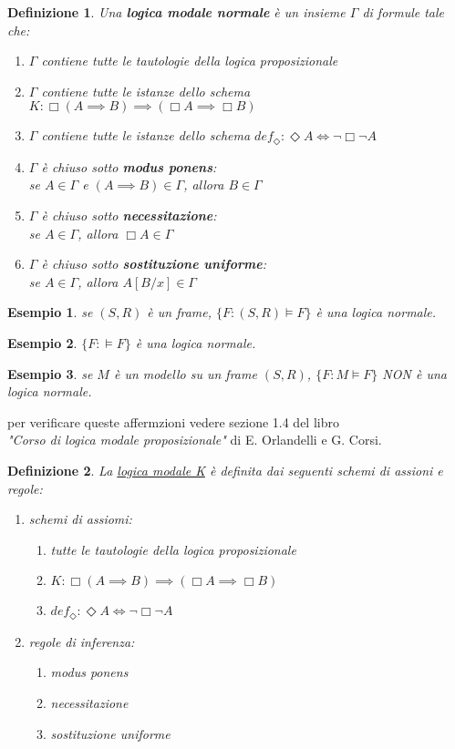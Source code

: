 \documentclass[a4paper,12pt]{article}
\theoremstyle{def}
\newtheorem*{definition}{Definizione}
\theoremstyle{prop}
\theoremstyle{esempio}
\newtheorem*{example}{Esempio}
\theoremstyle{dimostrazione}
\theoremstyle{teo}
\theoremstyle{osservazione}
\begin{document}
\begin{definition}
	Una \textbf{logica modale normale} è un insieme \(\Gamma\) di formule tale che:
	\begin{enumerate}
		\item \(\Gamma\) contiene tutte le tautologie della logica proposizionale
		\item \(\Gamma\) contiene tutte le istanze dello schema \(K: \Box (A \implies B) \implies (\Box A \implies \Box B)\)
		\item \(\Gamma\) contiene tutte le istanze dello schema \(def_\Diamond : \Diamond A \iff \neg \Box \neg A\)
		\item \(\Gamma\) è chiuso sotto \textbf{modus ponens}:\\
		      se \(A \in \Gamma\) e \((A \implies B) \in \Gamma\), allora \(B \in \Gamma\)
		\item \(\Gamma\) è chiuso sotto \textbf{necessitazione}:\\
		      se \(A \in \Gamma\), allora \(\Box A \in \Gamma\)
		\item \(\Gamma\) è chiuso sotto \textbf{sostituzione uniforme}:\\
		      se \(A \in \Gamma\), allora \(A[B/x] \in \Gamma\)
	\end{enumerate}
\end{definition}
\begin{example}
	se \((S,R)\) è un frame, \(\{F: (S,R) \vDash F\}\) è una logica normale.
\end{example}
\begin{example}
	\(\{F: \vDash F\}\) è una logica normale.
\end{example}
\begin{example}
	se \(M\) è un modello su un frame \((S,R)\), \(\{F: M \vDash F\}\) NON è una logica normale.
\end{example}
per verificare queste affermzioni vedere sezione 1.4 del libro\\
\textit{"Corso di logica modale proposizionale"} di E. Orlandelli e G. Corsi.\\
\newpage
\begin{definition}
	La \underline{logica modale K} è definita dai seguenti schemi di assioni e regole:
	\begin{enumerate}
		\item schemi di assiomi:
		      \begin{enumerate}
			      \item tutte le tautologie della logica proposizionale
			      \item \(K: \Box (A \implies B) \implies (\Box A \implies \Box B)\)
			      \item \(def_\Diamond : \Diamond A \iff \neg \Box \neg A\)
		      \end{enumerate}
		\item regole di inferenza:
		      \begin{enumerate}
			      \item modus ponens
			      \item necessitazione
			      \item sostituzione uniforme
		      \end{enumerate}
	\end{enumerate}
\end{definition}
\end{document}
